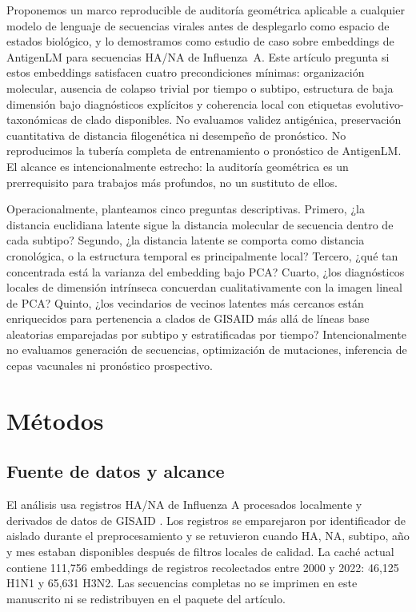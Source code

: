 \documentclass[11pt]{article}
\begin{document}
Proponemos un marco reproducible de auditoría geométrica aplicable a cualquier modelo de lenguaje de secuencias virales antes de desplegarlo como espacio de estados biológico, y lo demostramos como estudio de caso sobre embeddings de AntigenLM para secuencias HA/NA de Influenza~A. Este artículo pregunta si estos embeddings satisfacen cuatro precondiciones mínimas: organización molecular, ausencia de colapso trivial por tiempo o subtipo, estructura de baja dimensión bajo diagnósticos explícitos y coherencia local con etiquetas evolutivo-taxonómicas de clado disponibles. No evaluamos validez antigénica, preservación cuantitativa de distancia filogenética ni desempeño de pronóstico. No reproducimos la tubería completa de entrenamiento o pronóstico de AntigenLM. El alcance es intencionalmente estrecho: la auditoría geométrica es un prerrequisito para trabajos más profundos, no un sustituto de ellos.

Operacionalmente, planteamos cinco preguntas descriptivas. Primero, ¿la distancia euclidiana latente sigue la distancia molecular de secuencia dentro de cada subtipo? Segundo, ¿la distancia latente se comporta como distancia cronológica, o la estructura temporal es principalmente local? Tercero, ¿qué tan concentrada está la varianza del embedding bajo PCA? Cuarto, ¿los diagnósticos locales de dimensión intrínseca concuerdan cualitativamente con la imagen lineal de PCA? Quinto, ¿los vecindarios de vecinos latentes más cercanos están enriquecidos para pertenencia a clados de GISAID más allá de líneas base aleatorias emparejadas por subtipo y estratificadas por tiempo? Intencionalmente no evaluamos generación de secuencias, optimización de mutaciones, inferencia de cepas vacunales ni pronóstico prospectivo.

\section{Métodos}

\subsection{Fuente de datos y alcance}

El análisis usa registros HA/NA de Influenza A procesados localmente y derivados de datos de GISAID \cite{shu2017gisaid}. Los registros se emparejaron por identificador de aislado durante el preprocesamiento y se retuvieron cuando HA, NA, subtipo, año y mes estaban disponibles después de filtros locales de calidad. La caché actual contiene 111,756 embeddings de registros recolectados entre 2000 y 2022: 46,125 H1N1 y 65,631 H3N2. Las secuencias completas no se imprimen en este manuscrito ni se redistribuyen en el paquete del artículo.
\end{document}
